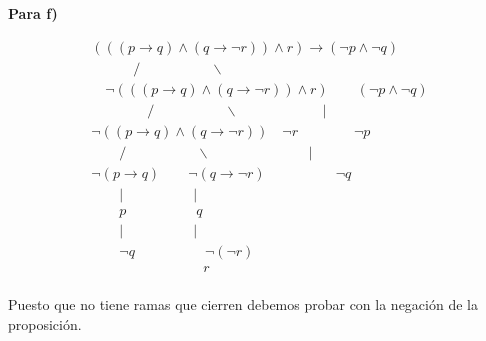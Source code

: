 \textbf{Para f)}
\begin{center}
\[
\begin{array}{c}
(((p \rightarrow q)\land (q \rightarrow \neg r)) \land r) \rightarrow (\neg p \land \neg q) \\
\quad \quad \quad / \quad \quad \quad \quad \quad \backslash \\
\quad \neg (((p \rightarrow q)\land (q \rightarrow \neg r))\land r)  \quad \quad (\neg p \land \neg q)\\
\quad \quad \quad \quad/ \quad \quad \quad \quad \quad  \backslash \quad \quad \quad \quad \quad \quad |\\
\neg ((p \rightarrow q)\land (q \rightarrow \neg r))\quad \neg r  \quad \quad \quad \quad \neg p\\
\quad \quad/ \quad \quad \quad \quad \quad  \backslash \quad \quad \quad \quad \quad \quad \quad |\\
\neg (p \rightarrow q) \quad \quad \neg (q \rightarrow \neg r) \quad  \quad \quad \quad  \quad \neg q \\
\quad \quad |\quad \quad \quad \quad \quad | \quad \quad \quad \quad \quad \quad \quad \quad \\
\quad \quad p\quad \quad \quad \quad \quad q \quad \quad \quad \quad \quad \quad \quad \quad \\
\quad \quad |\quad \quad \quad \quad \quad | \quad \quad \quad \quad \quad \quad \quad \quad \\
\quad \quad \neg q \quad \quad \quad \quad \quad \neg(\neg r) \quad \quad \quad \quad \quad \quad \quad \quad \\
\quad \quad \quad  \quad \quad \quad \quad \quad  r \quad \quad \quad \quad \quad \quad \quad \quad \\

\end{array}
\]
\end{center}

Puesto que no tiene ramas que cierren debemos probar con la negación de la proposición.


